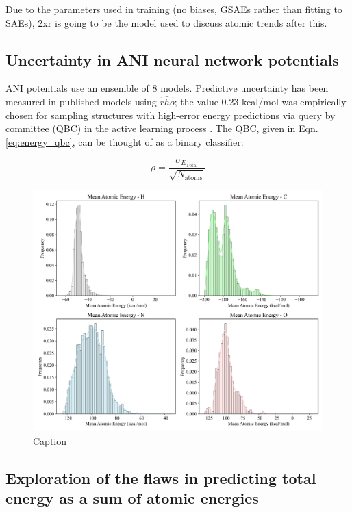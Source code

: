 Due to the parameters used in training (no biases, GSAEs rather than fitting to SAEs), 2xr is going to be the model used to discuss atomic trends after this.

\subsection{Uncertainty in ANI neural network potentials}
\label{subsec:ANI_uncertainty}

ANI potentials use an ensemble of 8 models.
Predictive uncertainty has been measured in published models using $\hat{rho}$; the value 0.23 kcal/mol was empirically chosen for sampling structures with high-error energy predictions via query by committee (QBC) in the active learning process \cite{ani-1x}.
The QBC, given in Eqn. \ref{eq:energy_qbc}, can be thought of as a binary classifier: 

\begin{equation}
\rho = \frac{\sigma_{E_{\text{Total}}}}{\sqrt{N_{\text{atoms}}}}
\label{eq:energy_qbc}
\end{equation}

\begin{figure}[!hb]
    \centering
    \includegraphics[width=1\linewidth]{Images/2xr_outputs/2xr_1x-first_mean-ae-per-atomtype.png}
    \caption{Caption}
    \label{fig:2xr_1x-first_mean-ae-per-atomtype}
\end{figure}

\subsection{Exploration of the flaws in predicting total energy as a sum of atomic energies}
\label{subsec:flaws_in_atomic_energies}

